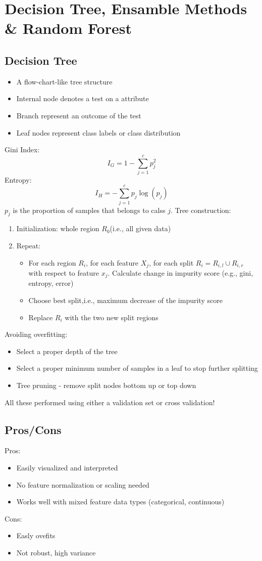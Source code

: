 \section{Decision Tree, Ensamble Methods \& Random Forest}
\subsection{Decision Tree}
\begin{itemize}
    \item A flow-chart-like tree structure
    \item Internal node denotes a test on a attribute
    \item Branch represent an outcome of the test
    \item Leaf nodes represent class labels or class distribution
\end{itemize}
Gini Index:
\[
I_G = 1- \sum_{j = 1}^{c}p_j^2
\]
Entropy:
\[
I_H = - \sum_{j = 1}^{c} p_j \log(p_j)
\]
\(p_j\) is the proportion of samples that belongs to calss \(j\).
Tree construction:
\begin{enumerate}
    \item Initialization: whole region \(R_0\)(i.e., all given data)
    \item Repeat:
    \begin{itemize} 
        \item For each region \(R_i\), for each feature \(X_j\), for each split \(R_i = R_{i,l} \cup R_{i,r}\) with respect to feature \(x_j\). Calculate change in impurity score (e.g., gini, entropy, error)
        \item Choose best split,i.e., maximum decrease of the impurity score
        \item Replace \(R_i\) with the two new split regions
    \end{itemize}
\end{enumerate}
Avoiding overfitting:
\begin{itemize}
    \item Select a proper depth of the tree
    \item Select a proper minimum number of samples in a leaf to stop further splitting
    \item Tree pruning - remove split nodes bottom up or top down
\end{itemize}
All these performed using either a validation set or cross validation!

\subsection{Pros/Cons}
Pros:
\begin{itemize}
    \item Easily visualized and interpreted
    \item No feature normalization or scaling needed
    \item Works well with mixed feature data types (categorical, continuous)
\end{itemize}
Cons:
\begin{itemize}
    \item Easly ovefits
    \item Not robust, high variance
\end{itemize}
